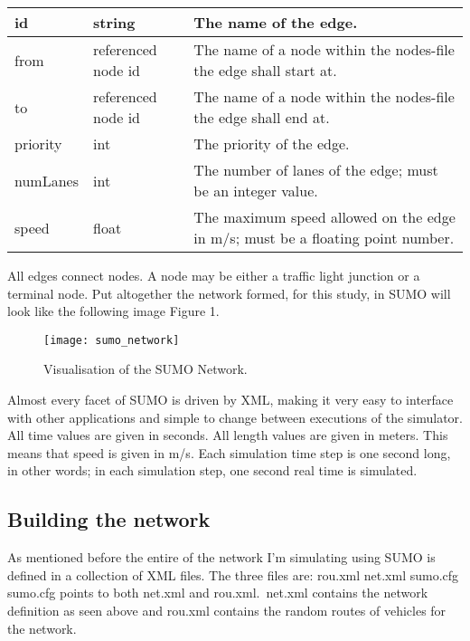 \documentclass[a4paper,10pt]{article}
\begin{document}
\begin{center}
    \begin{tabular}{| l | l | p{10cm} |}
    \hline
    id & string & The name of the edge. \\ \hline
    from & referenced node id & The name of a node within the nodes-file the edge shall start at. \\ \hline
    to & referenced node id & The name of a node within the nodes-file the edge shall end at.\\ \hline
    priority & int & The priority of the edge. \\ \hline
    numLanes & int & The number of lanes of the edge; must be an integer value. \\ \hline
    speed & float & The maximum speed allowed on the edge in m/s; must be a floating point number. \\ \hline
    \end{tabular}
\end{center}
 
All edges connect nodes. A node may be either a traffic light junction or a terminal node. Put altogether the network formed,
for this study, in SUMO will look like the following image Figure 1.

\begin{figure}[h!]
  \caption{Visualisation of the SUMO Network.}
  \centering
    \texttt{[image: sumo\_network]}
\end{figure}

Almost every facet of SUMO is driven by XML, making it very easy to interface with other applications and simple to change between 
executions of the simulator. All time values are given in seconds. All length values are given in meters. This means that speed is 
given in m/s. Each simulation time step is one second long, in other words; in each simulation step, one second real time is simulated.

\subsection{Building the network}
As mentioned before the entire of the network I’m simulating using SUMO is defined in a collection of XML files. The three files are:
\newline
\newline
rou.xml\newline 
net.xml\newline
sumo.cfg\newline
\newline
sumo.cfg points to both net.xml and rou.xml.\ net.xml contains the network definition as seen above and rou.xml contains the random routes
of vehicles for the network.
\end{document}
